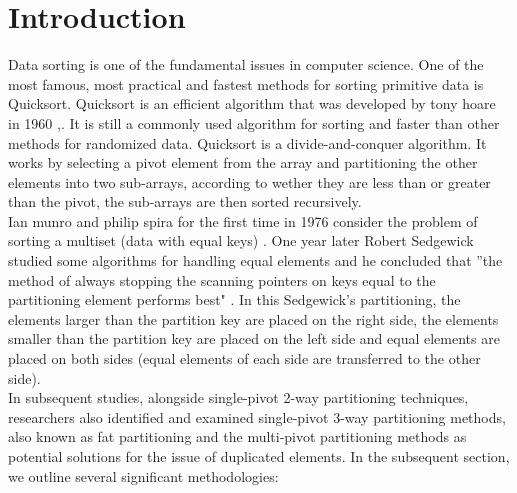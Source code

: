 \documentclass{article}
\begin{document}
\section {Introduction}
Data sorting is one of the fundamental issues in computer science. One of the most famous, most practical and fastest methods for sorting primitive data is Quicksort.   Quicksort is an efficient algorithm that was developed by tony hoare  in 1960 \cite{hoa},\cite{HO}. It is still a commonly used algorithm for sorting and  faster than other methods for  randomized data. Quicksort is a divide-and-conquer algorithm. It works by selecting a pivot element from the array and partitioning the other elements into two sub-arrays, according to wether they are less than or greater than the pivot, the sub-arrays are then sorted recursively.\\
Ian munro and philip spira for the first time in 1976 consider the problem of sorting a multiset (data with equal keys) \cite{MS}. One year later Robert Sedgewick  studied some algorithms  for handling  equal elements \cite{Rs} and he concluded that  ”the method of always stopping the scanning pointers on keys equal to the partitioning element performs best" . In this Sedgewick's partitioning, the elements larger than the partition key are placed on the right side,  the elements smaller than the  partition key are placed on the left side and equal elements are placed on both sides (equal elements of each side are transferred to the other side).
\\
In subsequent studies, alongside single-pivot 2-way partitioning techniques, researchers also identified and examined single-pivot 3-way partitioning methods, also known as fat partitioning and the multi-pivot partitioning methods as potential solutions for the issue of duplicated elements\cite{KM}. In the subsequent section, we outline several significant methodologies:
\\
\end{document}
